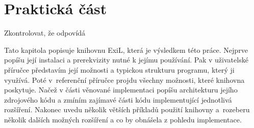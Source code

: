 \section{Praktická část}

\begin{framed}
  Zkontrolovat, že odpovídá
\end{framed}

Tato kapitola popisuje knihovnu ExiL, která je výsledkem této práce.
Nejprve popíšu její instalaci a prerekvizity nutné k jejímu používání. Pak v
uživatelské příručce představím její možnosti a typickou strukturu programu,
který ji využívá.  Poté v~referenční příručce projdu všechny možnosti, které
knihovna poskytuje.  Načež v části věnované implementaci popíšu architekturu
jejího zdrojového kódu a zmíním zajímavé části kódu implementující jednotlivá
rozšíření.  Nakonec uvedu několik větších příkladů použití knihovny a~rozeberu
několik dalších možných rozšíření a co by obnášela z pohledu implementace.


\clearpage

\clearpage

% 
\clearpage

